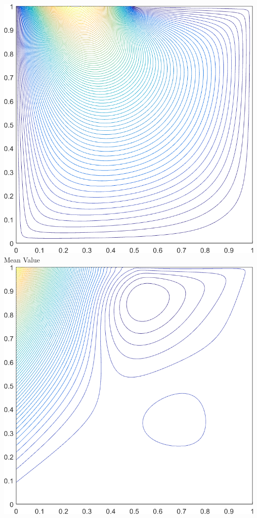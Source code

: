 \documentclass[compress,10pt]{beamer}
\begin{document}
\begin{frame}[t]
{\begin{columns}
{}\includegraphics[width=0.85\columnwidth]{images/deg_square_MV2_contour_b9.png} \\
Mean Value
\centering
{}\includegraphics[width=0.85\columnwidth]{images/deg_square_MAXENT2_contour_b5.png} \\
\vspace{3mm}

\end{columns}}
\end{frame}
\end{document}
